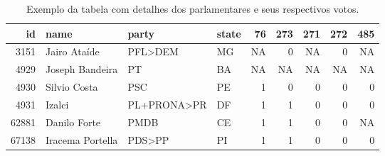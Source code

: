 \documentclass[a4paper,titlepage]{ppgi}\usepackage[]{graphicx}\usepackage[]{color}
\newenvironment{knitrout}{}{} %
\begin{document}
\begin{table}
\centering
\begin{knitrout}
\color{fgcolor}
\begin{tabular}{r|l|l|l|r|r|r|r|r}
\hline
id & name & party & state & 76 & 273 & 271 & 272 & 485\\
\hline
3151 & Jairo Ataíde & PFL>DEM & MG & NA & 0 & NA & 0 & NA\\
\hline
4929 & Joseph Bandeira & PT & BA & NA & NA & NA & NA & NA\\
\hline
4930 & Silvio Costa & PSC & PE & 1 & 0 & 0 & 0 & 0\\
\hline
4931 & Izalci & PL+PRONA>PR & DF & 1 & 1 & 0 & 0 & 0\\
\hline
62881 & Danilo Forte & PMDB & CE & 1 & 1 & 0 & 0 & NA\\
\hline
67138 & Iracema Portella & PDS>PP & PI & 1 & 1 & 0 & 0 & 0\\
\hline
\end{tabular}


\end{knitrout}
\caption{Exemplo da tabela com detalhes dos parlamentares e seus respectivos votos.}
\label{table:votes}
\end{table}
\end{document}
